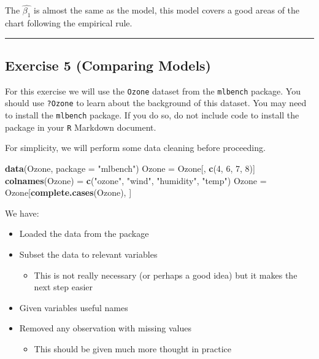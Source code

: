 \documentclass[]{article}
\newenvironment{Shaded}{\begin{snugshade}}{\end{snugshade}}
\newcommand{\DataTypeTok}[1]{\textcolor[rgb]{0.13,0.29,0.53}{#1}}
\newcommand{\DecValTok}[1]{\textcolor[rgb]{0.00,0.00,0.81}{#1}}
\newcommand{\KeywordTok}[1]{\textcolor[rgb]{0.13,0.29,0.53}{\textbf{#1}}}
\newcommand{\NormalTok}[1]{#1}
\newcommand{\StringTok}[1]{\textcolor[rgb]{0.31,0.60,0.02}{#1}}
\providecommand{\tightlist}{%
  \setlength{\itemsep}{0pt}\setlength{\parskip}{0pt}}
\begin{document}
The \(\hat{\beta_1}\) is almost the same as the model, this model covers
a good areas of the chart following the empirical rule.

\begin{center}\rule{0.5\linewidth}{0.5pt}\end{center}

\hypertarget{exercise-5-comparing-models}{%
\subsection{Exercise 5 (Comparing
Models)}\label{exercise-5-comparing-models}}

For this exercise we will use the \texttt{Ozone} dataset from the
\texttt{mlbench} package. You should use \texttt{?Ozone} to learn about
the background of this dataset. You may need to install the
\texttt{mlbench} package. If you do so, do not include code to install
the package in your \texttt{R} Markdown document.

For simplicity, we will perform some data cleaning before proceeding.

\begin{Shaded}
\begin{Highlighting}[]
\KeywordTok{data}\NormalTok{(Ozone, }\DataTypeTok{package =} \StringTok{"mlbench"}\NormalTok{)}
\NormalTok{Ozone =}\StringTok{ }\NormalTok{Ozone[, }\KeywordTok{c}\NormalTok{(}\DecValTok{4}\NormalTok{, }\DecValTok{6}\NormalTok{, }\DecValTok{7}\NormalTok{, }\DecValTok{8}\NormalTok{)]}
\KeywordTok{colnames}\NormalTok{(Ozone) =}\StringTok{ }\KeywordTok{c}\NormalTok{(}\StringTok{"ozone"}\NormalTok{, }\StringTok{"wind"}\NormalTok{, }\StringTok{"humidity"}\NormalTok{, }\StringTok{"temp"}\NormalTok{)}
\NormalTok{Ozone =}\StringTok{ }\NormalTok{Ozone[}\KeywordTok{complete.cases}\NormalTok{(Ozone), ]}
\end{Highlighting}
\end{Shaded}

We have:

\begin{itemize}
\tightlist
\item
  Loaded the data from the package
\item
  Subset the data to relevant variables

  \begin{itemize}
  \tightlist
  \item
    This is not really necessary (or perhaps a good idea) but it makes
    the next step easier
  \end{itemize}
\item
  Given variables useful names
\item
  Removed any observation with missing values

  \begin{itemize}
  \tightlist
  \item
    This should be given much more thought in practice
  \end{itemize}
\end{itemize}
\end{document}

